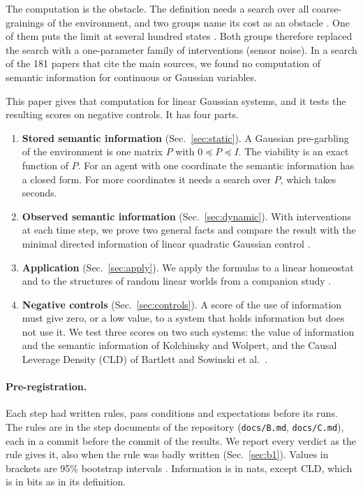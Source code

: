 \documentclass[11pt]{article}
\begin{document}
The computation is the obstacle. The definition needs a search over all coarse-grainings of the environment, and two
groups name its cost as an obstacle \cite{Sowinski23,SowinskiFrankGhoshal24}. One of them puts the limit at several
hundred states \cite{SowinskiFrankGhoshal24}.
Both groups therefore replaced the search with a one-parameter family of interventions (sensor noise). In a search of
the 181 papers that cite the main sources, we found no computation of semantic information for continuous or Gaussian
variables.

This paper gives that computation for linear Gaussian systems, and it tests the resulting scores on negative controls.
It has four parts.
\begin{enumerate}
\item \textbf{Stored semantic information} (Sec.~\ref{sec:static}). A Gaussian pre-garbling of the environment is one
matrix $P$ with $0\preceq P\preceq I$. The viability is an exact function of $P$. For an agent with one coordinate the
semantic information has a closed form. For more coordinates it needs a search over $P$, which takes seconds.
\item \textbf{Observed semantic information} (Sec.~\ref{sec:dynamic}). With interventions at each time step, we prove
two general facts and compare the result with the minimal directed information of linear quadratic Gaussian control
\cite{TanakaEsfahaniMitter18}.
\item \textbf{Application} (Sec.~\ref{sec:apply}). We apply the formulas to a linear homeostat and to the structures of
random linear worlds from a companion study \cite{Beiro26}.
\item \textbf{Negative controls} (Sec.~\ref{sec:controls}). A score of the use of information must give zero, or a
low value, to a system that holds information but does not use it. We test three scores on two such systems: the value of
information and the semantic information of Kolchinsky and Wolpert, and the Causal Leverage Density (CLD) of Bartlett
and Sowinski et al.\ \cite{Bartlett24,SowinskiEtAl25}.
\end{enumerate}

\paragraph{Pre-registration.} Each step had written rules, pass conditions and expectations before its runs. The rules
are in the step documents of the repository (\texttt{docs/B.md}, \texttt{docs/C.md}), each in a commit before the
commit of the results. We report every verdict as the rule gives it, also when the rule was badly written
(Sec.~\ref{sec:b1}). Values in brackets are 95\% bootstrap intervals \cite{Efron79}. Information is in nats, except
CLD, which is in bits as in its definition.
\end{document}
